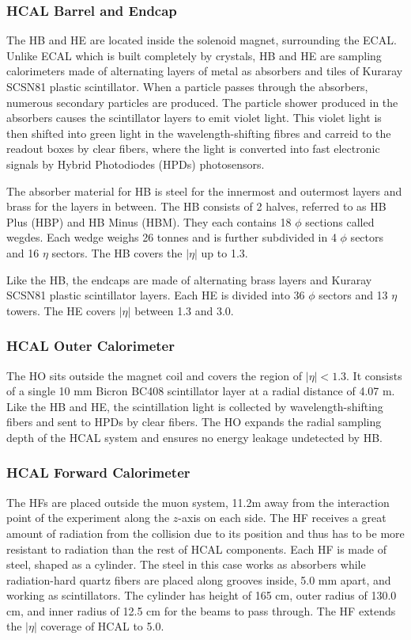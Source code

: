 \subsubsection{HCAL Barrel and Endcap}
The HB and HE are located inside the solenoid magnet, surrounding the ECAL. Unlike ECAL which is built completely by crystals, HB and HE are sampling calorimeters made of alternating layers of metal as absorbers and tiles of Kuraray SCSN81 plastic scintillator. When a particle passes through the absorbers, numerous secondary particles are produced. The particle shower produced in the absorbers causes the scintillator layers to emit violet light. This violet light is then shifted into green light in the wavelength-shifting fibres and carreid to the readout boxes by clear fibers, where the light is converted into fast electronic signals by Hybrid Photodiodes (HPDs) photosensors.

\vspace{0.3cm}
The absorber material for HB is steel for the innermost and outermost layers and brass for the layers in between. The HB consists of 2 halves, referred to as HB Plus (HBP) and HB Minus (HBM). They each contains 18 $\phi$ sections called wegdes. Each wedge weighs 26 tonnes and is further subdivided in 4 $\phi$ sectors and 16 $\eta$ sectors. The HB covers the $|\eta|$ up to 1.3.

\vspace{0.3cm}
Like the HB, the endcaps are made of alternating brass layers and Kuraray SCSN81 plastic scintillator layers. Each HE is divided into 36 $\phi$ sectors and 13 $\eta$ towers. The HE covers $|\eta|$ between 1.3 and 3.0.

\subsubsection{HCAL Outer Calorimeter}
The HO sits outside the magnet coil and covers the region of $|\eta|<1.3$. It consists of a single 10 mm Bicron BC408 scintillator layer at a radial distance of 4.07 m. Like the HB and HE, the scintillation light is collected by wavelength-shifting fibers and sent to HPDs by clear fibers. The HO expands the radial sampling depth of the HCAL system and ensures no energy leakage undetected by HB.

\subsubsection{HCAL Forward Calorimeter}
The HFs are placed outside the muon system, 11.2m away from the interaction point of the experiment along the $z$-axis on each side. The HF receives a great amount of radiation from the collision due to its position and thus has to be more resistant to radiation than the rest of HCAL components. Each HF is made of steel, shaped as a cylinder. The steel in this case works as absorbers while radiation-hard quartz fibers are placed along grooves inside, 5.0 mm apart, and working as scintillators. The cylinder has height of 165 cm, outer radius of 130.0 cm, and inner radius of 12.5 cm for the beams to pass through. The HF extends the $|\eta|$ coverage of HCAL to 5.0.

